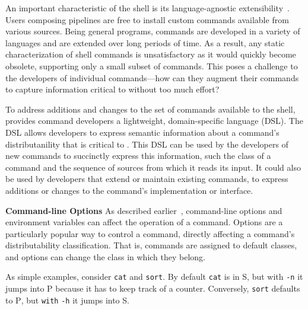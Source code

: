 \documentclass[sigplan,10pt,review,anonymous]{acmart}
\newcommand{\heading}[1]{\vspace{4pt}\noindent\textbf{#1}\enspace}
\newcommand{\ttt}[1]{\texttt{\small #1}}
\newcommand{\cn}[1]{\mbox{\textcircled{\footnotesize #1}}}
\newcommand{\pur}{\cn{\textsc{P}}\xspace}
\newcommand{\sta}{\cn{\textsc{S}}\xspace}
\newcommand{\nv}[1]{[{\color{cyan}#1 --- nv}]}
\newcommand{\kk}[1]{[{\color{magenta}#1 --- kk}]}
\begin{document}
An important characteristic of the \unix shell is its language-agnostic extensibility~.
Users composing pipelines are free to install custom commands available from various sources.
Being general programs, commands are developed in a variety of languages and are extended over long periods of time.
As a result, any static characterization of shell commands is unsatisfactory as it would quickly become obsolete, supporting only a small subset of commands.
This poses a challenge to the developers of individual commands---how can they augment their commands to capture information critical to \sys without too much effort?

To address additions and changes to the set of commands available to the shell, \sys provides command developers a lightweight, domain-specific language (DSL).
The DSL allows developers to express semantic information about a command's distributanility that is critical to \sys.
This DSL can be used by the developers of new commands to succinctly express this information, such the class of a command and the sequence of sources from which it reads its input.
It could also be used by developers that extend or maintain existing commands, to express additions or changes to the command's implementation or interface.

\heading{Command-line Options}
As described earlier~, command-line options and environment variables can affect the operation of a command.
Options are a particularly popular way to control a command, 
  directly affecting a command's distributability classification.
That is, commands are assigned to default classes, and options can change the class in which they belong.

As simple examples, consider \ttt{cat} and \ttt{sort}.
By default \ttt{cat} is in \sta, but with \ttt{-n} it jumps into \pur because it has to keep track of a counter.
Conversely, \ttt{sort} defaults to \pur, but \ttt{with} \ttt{-h} it jumps into \sta.

\end{document}
